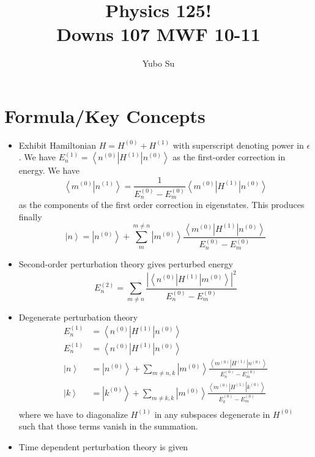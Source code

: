 \documentclass[10pt]{report}
\newcommand{\bra}[1]{\left<#1\right|}
\newcommand{\ket}[1]{\left|#1\right>}
\newcommand{\dotp}[2]{\left<#1\left.\right|#2\right>}
\newcommand{\abs}[1]{\left|#1\right|}
\begin{document}

\title{Physics 125!\\ Downs 107 MWF 10-11}
\author{Yubo Su}
\date{ }

\maketitle
\small
\tableofcontents

\chapter{Formula/Key Concepts}

\begin{itemize}
    \item Exhibit Hamiltonian $H = H^{(0)} + H^{(1)}$ with superscript denoting power in $\epsilon$. We have $E_n^{(1)} = \bra{n^{(0)}}H^{(1)}\ket{n^{(0)}}$ as the first-order correction in energy. We have 
        $$\dotp{m^{(0)}}{n^{(1)}} = \frac{1}{E_n^{(0)} - E_{m}^{(0)}}\bra{m^{(0)}}H^{(1)}\ket{n^{(0)}}$$
        as the components of the first order correction in eigenstates. This produces finally
        $$
        \ket{n} = \ket{n^{(0)}} + \sum_{m}^{m \neq n} \ket{m^{(0)}}\frac{\bra{m^{(0)}}H^{(1)}\ket{n^{(0)}}}{E_n^{(0)} - E_m^{(0)}}
        $$
    \item Second-order perturbation theory gives perturbed energy
        $$E_n^{(2)} = \sum_{m \neq n}\frac{\abs{\bra{n^{(0)}}H^{(1)}\ket{m^{(0)}}}^2}{E_n^{(0)} - E_m^{(0)}}$$
    \item Degenerate perturbation theory
        \begin{align*}
            E_n^{(1)} &= \bra{n^{(0)}}H^{(1)}\ket{n^{(0)}}\\
            E_n^{(1)} &= \bra{n^{(0)}}H^{(1)}\ket{n^{(0)}}\\
            \ket{n} &= \ket{n^{(0)}} + \sum_{m\neq n,k}\ket{m^{(0)}}\frac{\bra{m^{(0)}}H^{(1)}\ket{n^{(0)}}}{E_n^{(0)} - E_m^{(0)}}\\
            \ket{k} &= \ket{k^{(0)}} + \sum_{m\neq k,k}\ket{m^{(0)}}\frac{\bra{m^{(0)}}H^{(1)}\ket{k^{(0)}}}{E_k^{(0)} - E_m^{(0)}}\\
        \end{align*}
        where we have to diagonalize $H^{(1)}$ in any subspaces degenerate in $H^{(0)}$ such that those terms vanish in the summation. 
    \item Time dependent perturbation theory is given

\end{itemize}
\end{document}
